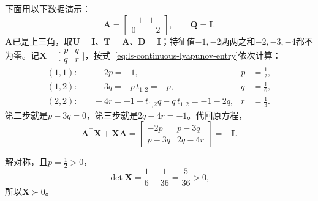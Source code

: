 \begin{example}[连续型方程的逐元素递推]
\label{ex:ls-continuous-lyapunov-entries}
下面用以下数据演示：
\[
 \bm A=\begin{bmatrix}-1&1\\0&-2\end{bmatrix},\qquad \bm Q=\bm I .
\]
$\bm A$已是上三角，取$\bm U=\bm I$、$\bm T=\bm A$、$\bm D=\bm I$；特征值$-1,-2$两两之和$-2,-3,-4$都不为零。记$\bm X=\bigl[\begin{smallmatrix}p&q\\q&r\end{smallmatrix}\bigr]$，按式~\eqref{eq:ls-continuous-lyapunov-entry}依次计算：
\[
 \begin{aligned}
 (1,1):&\quad -2p=-1, & p&=\tfrac12,\\
 (1,2):&\quad -3q=-p\,t_{1,2}=-p, & q&=\tfrac16,\\
 (2,2):&\quad -4r=-1-t_{1,2}q-q\,t_{1,2}=-1-2q, & r&=\tfrac13 .
 \end{aligned}
\]
第二步就是$p-3q=0$，第三步就是$2q-4r=-1$。代回原方程，
\[
 \bm A^\top\bm X+\bm X\bm A=\begin{bmatrix}-2p&p-3q\\p-3q&2q-4r\end{bmatrix}=-\bm I .
\]

解对称，且$p=\tfrac12>0$，
\[
 \det\bm X=\frac16-\frac1{36}=\frac5{36}>0 ,
\]
所以$\bm X\succ0$。
\end{example}

